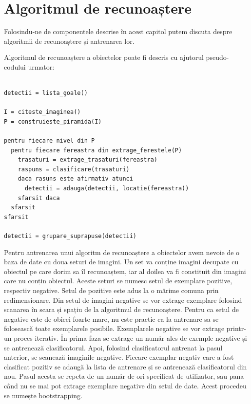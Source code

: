 \pagebreak
\section{Algoritmul de recunoaștere}

Folosindu-ne de componentele descrise în acest capitol putem discuta despre algoritmii de recunoaștere și antrenarea lor.

Algoritmul de recunoaștere a obiectelor poate fi descris cu ajutorul pseudo-codului urmator:
\begin{mdframed}
\begin{verbatim}

detectii = lista_goale()

I = citeste_imaginea()
P = construieste_piramida(I)

pentru fiecare nivel din P
  pentru fiecare fereastra din extrage_ferestele(P)
    trasaturi = extrage_trasaturi(fereastra)
    raspuns = clasificare(trasaturi)
    daca rasuns este afirmativ atunci
      detectii = adauga(detectii, locatie(fereastra))
    sfarsit daca
  sfarsit
sfarsit

detectii = grupare_suprapuse(detectii)

\end{verbatim}
\end{mdframed}

Pentru antrenarea unui algoritm de recunoaștere a obiectelor avem nevoie de o baza de date cu doua seturi de imagini.
Un set va conține imagini decupate cu obiectul pe care dorim sa îl recunoaștem, iar al doilea va fi constituit din imagini care nu conțin obiectul.
Aceste seturi se numesc setul de exemplare pozitive, respectiv negative.
Setul de pozitive este adus la o mărime comuna prin redimensionare.
Din setul de imagini negative se vor extrage exemplare folosind scanarea în scara și spațiu de la algoritmul de recunoaștere.
Pentru ca setul de negative este de obicei foarte mare, nu este practic ca la antrenare sa se folosească toate exemplarele posibile.
Exemplarele negative se vor extrage printr-un proces iterativ.
În prima faza se extrage un număr ales de exemple negative și se antrenează clasificatorul.
Apoi, folosind clasificatorul antrenat la pasul anterior, se scanează imaginile negative.
Fiecare exemplar negativ care a fost clasificat pozitiv se adaugă la lista de antrenare și se antrenează clasificatorul din nou.
Pasul acesta se repeta de un număr de ori specificat de utilizator, sau pana când nu se mai pot extrage exemplare negative din setul de date.
Acest procedeu se numește bootstrapping.

